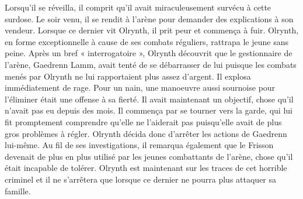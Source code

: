 \documentclass[main.tex]{subfiles}
\begin{document}
    Lorsqu'il se réveilla, il comprit qu'il avait miraculeusement survécu à cette surdose.
    Le soir venu, il se rendit à l'arène pour demander des explications à son vendeur.
    Lorsque ce dernier vit Olrynth, il prit peur et commença à fuir.
    Olrynth, en forme exceptionnelle à cause de ses combats réguliers, rattrapa le jeune sans peine.
    Après un bref « interrogatoire », Olrynth découvrit que le gestionnaire de l'arène, Gaedrenn Lamm, 
    avait tenté de se débarrasser de lui puisque les combats menés par Olrynth ne lui rapportaient plus assez d'argent. 
    Il explosa immédiatement de rage.
    Pour un nain, une manoeuvre aussi sournoise pour l'éliminer était une offense à sa fierté. 
    Il avait maintenant un objectif, chose qu'il n'avait pas eu depuis des mois.
    Il commença par se tourner vers la garde, qui lui fit promptement comprendre qu'elle ne l'aiderait pas puisqu'elle avait de plus gros problèmes à régler.
    Olrynth décida donc d'arrêter les actions de Gaedrenn lui-même.
    Au fil de ses investigations, il remarqua également que le Frisson devenait de plus en plus utilisé par les jeunes combattants de l'arène, chose qu'il était incapable de tolérer.
    Olrynth est maintenant sur les traces de cet horrible criminel et il ne s'arrêtera que lorsque ce dernier ne pourra plus attaquer sa famille.
\end{document}
